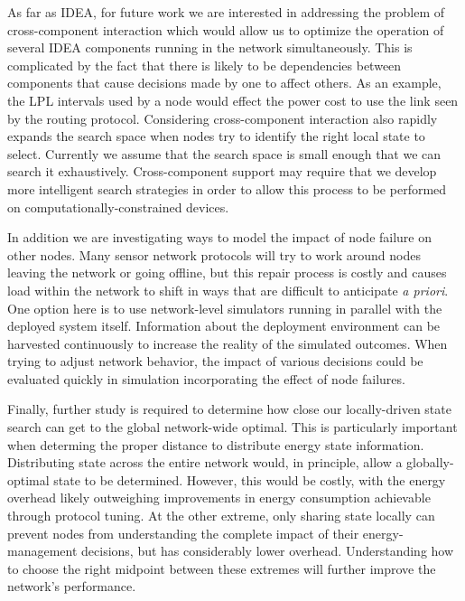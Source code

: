 As far as IDEA, for future work we are interested in addressing the problem
of cross-component interaction which would allow us to optimize the operation
of several IDEA components running in the network simultaneously. This is
complicated by the fact that there is likely to be dependencies between
components that cause decisions made by one to affect others. As an example,
the LPL intervals used by a node would effect the power cost to use the link
seen by the routing protocol. Considering cross-component interaction also
rapidly expands the search space when nodes try to identify the right local
state to select. Currently we assume that the search space is small enough
that we can search it exhaustively. Cross-component support may require that
we develop more intelligent search strategies in order to allow this process
to be performed on computationally-constrained devices.

In addition we are investigating ways to model the impact of node failure on
other nodes. Many sensor network protocols will try to work around nodes
leaving the network or going offline, but this repair process is costly and
causes load within the network to shift in ways that are difficult to
anticipate \textit{a priori}. One option here is to use network-level
simulators running in parallel with the deployed system itself. Information
about the deployment environment can be harvested continuously to increase
the reality of the simulated outcomes. When trying to adjust network
behavior, the impact of various decisions could be evaluated quickly in
simulation incorporating the effect of node failures.

Finally, further study is required to determine how close our locally-driven
state search can get to the global network-wide optimal. This is particularly
important when determing the proper distance to distribute energy state
information. Distributing state across the entire network would, in
principle, allow a globally-optimal state to be determined. However, this
would be costly, with the energy overhead likely outweighing improvements in
energy consumption achievable through protocol tuning. At the other extreme,
only sharing state locally can prevent nodes from understanding the complete
impact of their energy-management decisions, but has considerably lower
overhead. Understanding how to choose the right midpoint between these
extremes will further improve the network's performance.
